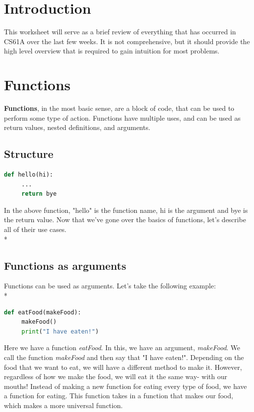 \documentclass{article}
\begin{document}
\maketitle
\section{Introduction}
This worksheet will serve as a brief review of everything that has occurred in CS61A over the last few weeks. It is not comprehensive, but it should provide the high level overview that is required to gain intuition for most problems.
\section{Functions}
\textbf{Functions}, in the most basic sense, are a block of code, that can be used to perform some type of action. Functions have multiple uses, and can be used as return values, nested definitions, and arguments. 

\subsection{Structure}
\begin{lstlisting}[language = Python]
def hello(hi):
     ...
     return bye
\end{lstlisting}
In the above function, "hello" is the function name, hi is the argument and bye is the return value. 
Now that we've gone over the basics of functions, let's describe all of their use cases. \\*
\subsection{Functions as arguments}
Functions can be used as arguments. Let's take the following example: \\*
\bigskip
\begin{lstlisting}[language = Python]
def eatFood(makeFood):
     makeFood()
     print("I have eaten!")
\end{lstlisting}
Here we have a function \emph{eatFood}. In this, we have an argument, \emph{makeFood}. We call the function \emph{makeFood} and then say that "I have eaten!". Depending on the food that we want to eat, we will have a different method to make it. However, regardless of how we make the food, we will eat it the same way- with our mouths! Instead of making a new function for eating every type of food, we have a function for eating. This function takes in a function that makes our food, which makes a more universal function. 
\end{document}

